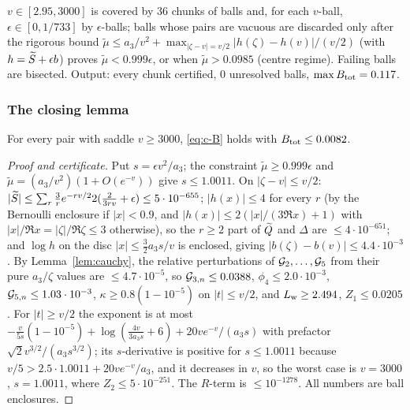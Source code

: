 \begin{certificate}\label{cert:c-laplace}
$v\in[2.95,3000]$ is covered by $36$ chunks of balls and, for each $v$-ball, $\epsilon\in[0,1/733]$ by $\epsilon$-balls;
balls whose pairs are vacuous are discarded only after the rigorous bound
$\tilde\mu\le a_3/v^2+\max_{|\zeta-v|=v/2}|h(\zeta)-h(v)|/(v/2)$ (with $h=\widetilde S+\epsilon b$) proves
$\tilde\mu<0.999\epsilon$, or when $\tilde\mu>0.0985$ (centre regime). Failing balls are bisected. Output: every chunk
certified, $0$ unresolved balls, $\max B_{\rm tot}=0.117$.
\end{certificate}

\subsubsection{The closing lemma}\label{sec:c-closing}

\begin{proposition}\label{prop:c-closing}
For every pair with saddle $v\ge3000$, \eqref{eq:c-B} holds with $B_{\rm tot}\le0.0082$.
\end{proposition}
\begin{proof}[Proof and certificate]
Put $s=\epsilon v^2/a_3$; the constraint $\tilde\mu\ge0.999\epsilon$ and $\tilde\mu=(a_3/v^2)(1+O(e^{-v}))$ give
$s\le1.0011$. On $|\zeta-v|\le v/2$: $|\widetilde S|\le\sum_r\frac3re^{-rv/2}2(\frac2{3rv}+\epsilon)\le5\cdot10^{-655}$; $|h(x)|\le4$
for every $r$ (by the Bernoulli enclosure if $|x|<0.9$, and $|h(x)|\le2(|x|/(3\Re x)+1)$ with
$|x|/\Re x=|\zeta|/\Re\zeta\le3$ otherwise), so the $r\ge2$ part of $\widetilde Q$ and $\Delta$ are $\le4\cdot10^{-651}$; and
$\log h$ on the disc $|x|\le\frac32a_3s/v$ is enclosed, giving $|b(\zeta)-b(v)|\le4.4\cdot10^{-3}$. By
Lemma~\ref{lem:cauchy}, the relative perturbations of $\mathcal G_2,\dots,\mathcal G_5$ from their pure $a_3/\zeta$ values are
$\le4.7\cdot10^{-5}$, so $\mathcal G_{3,n}\le0.0388$, $\phi_4\le2.0\cdot10^{-3}$, $\mathcal G_{5,n}\le1.03\cdot10^{-3}$,
$\kappa\ge0.8(1-10^{-5})$ on $|t|\le v/2$, and $L_{\rm w}\ge2.494$, $Z_1\le0.0205$. For $|t|\ge v/2$ the exponent is at most
$-\frac{v}{5s}(1-10^{-5})+\log(\frac{4v}{3a_3s}+6)+20ve^{-v}/(a_3s)$ with prefactor $\sqrt2v^{3/2}/(a_3s^{3/2})$; its
$s$-derivative is positive for $s\le1.0011$ because $v/5>2.5\cdot1.0011+20ve^{-v}/a_3$, and it decreases in $v$, so the
worst case is $v=3000$, $s=1.0011$, where $Z_2\le5\cdot10^{-251}$. The $R$-term is $\le10^{-1278}$. All numbers are ball
enclosures.
\end{proof}

